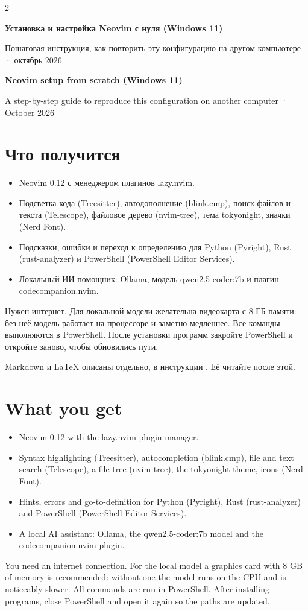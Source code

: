 \begin{paracol}{2}
\RU
{\Large\bfseries Установка и настройка Neovim с нуля (Windows 11)\par}
Пошаговая инструкция, как повторить эту конфигурацию на другом компьютере · октябрь 2026
\switchcolumn
\EN
{\Large\bfseries Neovim setup from scratch (Windows 11)\par}
A step-by-step guide to reproduce this configuration on another computer · October 2026
\switchcolumn*

\RU
\section*{Что получится}
\begin{itemize}\setlength\itemsep{1pt}
\item Neovim 0.12 с менеджером плагинов lazy.nvim.
\item Подсветка кода (Treesitter), автодополнение (blink.cmp), поиск файлов и текста (Telescope), файловое дерево (nvim-tree), тема tokyonight, значки (Nerd Font).
\item Подсказки, ошибки и переход к определению для Python (Pyright), Rust (rust-analyzer) и PowerShell (PowerShell Editor Services).
\item Локальный ИИ-помощник: Ollama, модель qwen2.5-coder:7b и плагин codecompanion.nvim.
\end{itemize}
Нужен интернет. Для локальной модели желательна видеокарта с 8 ГБ памяти: без неё модель работает на процессоре и заметно медленнее. Все команды выполняются в PowerShell. После установки программ закройте PowerShell и откройте заново, чтобы обновились пути.

Markdown и LaTeX описаны отдельно, в инструкции . Её читайте после этой.
\switchcolumn
\EN
\section*{What you get}
\begin{itemize}\setlength\itemsep{1pt}
\item Neovim 0.12 with the lazy.nvim plugin manager.
\item Syntax highlighting (Treesitter), autocompletion (blink.cmp), file and text search (Telescope), a file tree (nvim-tree), the tokyonight theme, icons (Nerd Font).
\item Hints, errors and go-to-definition for Python (Pyright), Rust (rust-analyzer) and PowerShell (PowerShell Editor Services).
\item A local AI assistant: Ollama, the qwen2.5-coder:7b model and the codecompanion.nvim plugin.
\end{itemize}
You need an internet connection. For the local model a graphics card with 8 GB of memory is recommended: without one the model runs on the CPU and is noticeably slower. All commands are run in PowerShell. After installing programs, close PowerShell and open it again so the paths are updated.


\end{paracol}
